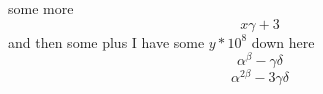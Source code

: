some more $$x \gamma + 3$$ and then some %
plus I have some $y*10^{8}$ down here
$$ %
\alpha^{\beta} -\gamma \delta
$$ %
\begin{equation}
\alpha^{2\beta} -3\gamma \delta
\end{equation}
